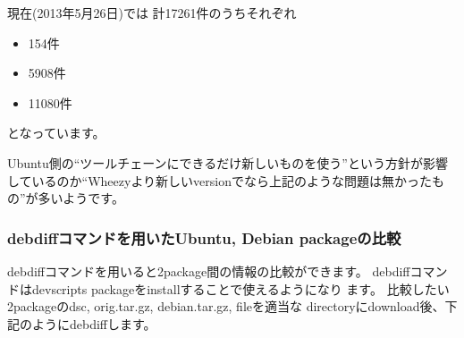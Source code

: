\documentclass[mingoth,a4paper]{jsarticle}
\begin{document}
現在(2013年5月26日)では 計17261件のうちそれぞれ

\begin{itemize}
\itemsep1pt\parskip0pt
\item
  154件
\item
  5908件
\item
  11080件
\end{itemize}

となっています。

Ubuntu側の``ツールチェーンにできるだけ新しいものを使う''という方針が影響
しているのか``Wheezyより新しいversionでなら上記のような問題は無かったも
の''が多いようです。

\subsubsection{debdiffコマンドを用いたUbuntu, Debian packageの比較}

debdiffコマンドを用いると2package間の情報の比較ができます。
debdiffコマンドはdevscripts packageをinstallすることで使えるようになり
ます。 比較したい2packageのdsc, orig.tar.gz, debian.tar.gz, fileを適当な
directoryにdownload後、下記のようにdebdiffします。
\end{document}

